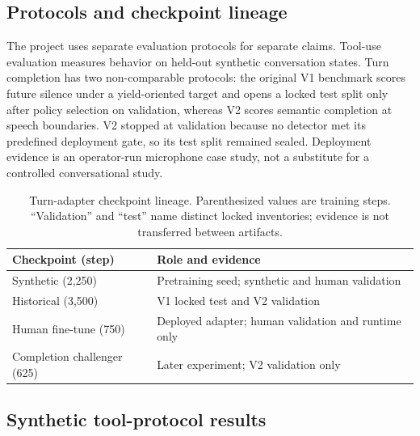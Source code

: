 \documentclass[10pt,twocolumn]{article}
\begin{document}
\subsection{Protocols and checkpoint lineage}

The project uses separate evaluation protocols for separate claims. Tool-use evaluation measures
behavior on held-out synthetic conversation states. Turn completion has two non-comparable
protocols: the original V1 benchmark scores future silence under a yield-oriented target and opens a
locked test split only after policy selection on validation, whereas V2 scores semantic completion
at speech boundaries. V2 stopped at validation because no detector met its predefined deployment
gate, so its test split remained sealed. Deployment evidence is an operator-run microphone case
study, not a substitute for a controlled conversational study.

\begin{table}[H]
\centering
\caption{Turn-adapter checkpoint lineage. Parenthesized values are training steps. ``Validation''
and ``test'' name distinct locked inventories; evidence is not transferred between artifacts.}
\footnotesize
\begin{tabularx}{\columnwidth}{@{}p{3.2cm}X@{}}
\toprule
Checkpoint (step) & Role and evidence \\
\midrule
Synthetic (2,250) & Pretraining seed; synthetic and human validation \\
Historical (3,500) & V1 locked test and V2 validation \\
Human fine-tune (750) & Deployed adapter; human validation and runtime only \\
Completion challenger (625) & Later experiment; V2 validation only \\
\bottomrule
\end{tabularx}
\label{tab:lineage}
\end{table}

\subsection{Synthetic tool-protocol results}
\end{document}
